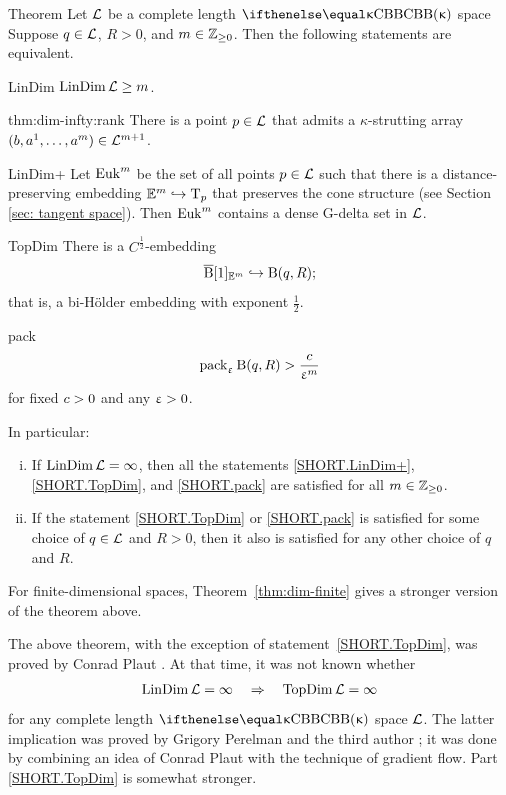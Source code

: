 \begin{thm}{Theorem}\label{thm:dim-infty}
Let $\mathcal{L}$ be a complete length $\Alex{\kappa}$ space 
Suppose $q\in \spc{L}$, 
$R>0$,
and $m\in \ZZ_{\ge0}$.
Then the following statements are equivalent.

\begin{subthmA}{LinDim} $\LinDim\spc{L}\ge m$.
\end{subthmA}

\begin{subthmA}{thm:dim-infty:rank}
There is a point $p\in\spc{L}$ that admits a $\kappa$-strutting array $(b,a^1,\dots,a^m)\in\spc{L}^{m+1}$.
\end{subthmA}

\begin{subthmA}{LinDim+} Let $\mathop{\rm Euk}\nolimits^m$ be the set 
of all points $p\in \spc{L}$ such that there is a distance-preserving embedding $\EE^m\hookrightarrow \T_p$
that preserves the cone structure 
(see Section \ref{sec: tangent space}).
Then $\mathop{\rm Euk}\nolimits^m$ contains a dense G-delta set in $\mathcal{L}$.
\end{subthmA}

\begin{subthmA}{TopDim}
There is a $C^{\frac{1}{2}}$-embedding
\[\cBall[1]_{\EE^m}\hookrightarrow \oBall(q,R);\]
that is, a bi-Hölder embedding with exponent $\tfrac{1}{2}$.
\end{subthmA}

\begin{subthmA}{pack} 
\[\mathop{\rm pack}\nolimits_\upvarepsilon \mathrm{B}{}(q,R)>\frac{c}{\upvarepsilon^m}\]
for fixed $c>0$ and any $\upvarepsilon>0$.
\end{subthmA}

\medskip

In particular:
\begin{enumerate}[(i)]
\item If $\mathop{\rm LinDim}\nolimits\mathcal{L}=\infty$, then all the statements \ref{SHORT.LinDim+}, \ref{SHORT.TopDim}, and \ref{SHORT.pack} are satisfied for all $m\in\ZZ_{\ge0}$. 
\item 
 If the statement \ref{SHORT.TopDim} or \ref{SHORT.pack} is satisfied for some choice of $q\in \spc{L}$ and $R>0$, then it also is satisfied for any other choice of $q$ and $R$.
\end{enumerate}
\end{thm}

For finite-dimensional spaces, Theorem~\ref{thm:dim-finite} gives a stronger version 
of the theorem above.

The above theorem, with the exception of statement~\ref{SHORT.TopDim}, was proved by Conrad Plaut \cite{plaut:dimension}.
At that time, it was not known whether
\[\mathop{\rm LinDim}\nolimits\mathcal{L}=\infty\quad \Rightarrow\quad \mathop{\rm TopDim}\nolimits\mathcal{L}=\infty\]
for any complete length $\Alex\kappa$ space $\mathcal{L}$.
The latter implication was proved by Grigory Perelman and the third author \cite{perelman-petrunin:qg};
it was done by combining an idea of Conrad Plaut with the technique of gradient flow.
Part \ref{SHORT.TopDim} is somewhat stronger.

